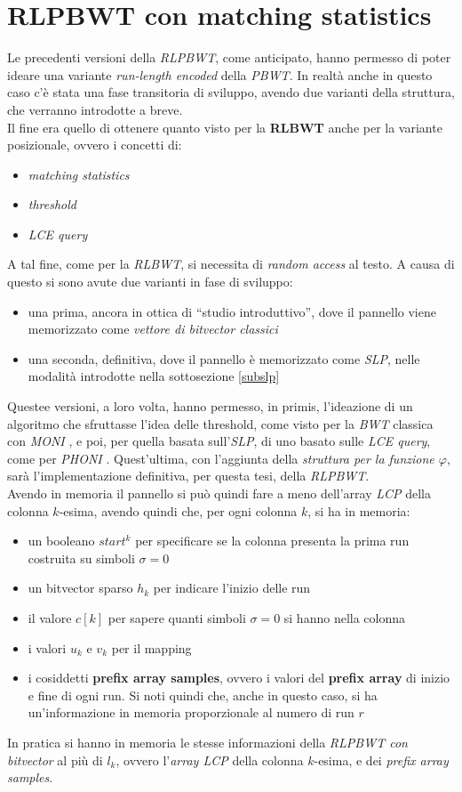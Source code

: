\section{RLPBWT con matching statistics}
Le precedenti versioni della \textit{RLPBWT}, come anticipato, hanno permesso di
poter ideare una variante \textit{run-length encoded} della \textit{PBWT}.
In realtà anche in questo caso c'è stata una fase transitoria di sviluppo,
avendo due varianti della struttura, che verranno introdotte a breve.\\
Il fine era quello di ottenere quanto visto per la \textbf{RLBWT} anche per la
variante posizionale, ovvero i concetti di:
\begin{itemize}
  \item \textit{matching statistics}
  \item \textit{threshold}
  \item \textit{LCE query}
\end{itemize}
A tal fine, come per la \textit{RLBWT}, si necessita di \textit{random access}
al testo. A causa di questo si sono avute due varianti in fase di sviluppo:
\begin{itemize}
  \item una prima, ancora in ottica di ``studio introduttivo'', dove il pannello
  viene memorizzato come \textit{vettore di bitvector classici}
  \item una seconda, definitiva, dove il pannello è memorizzato come
  \textit{SLP}, nelle modalità introdotte nella sottosezione \ref{subslp}
\end{itemize}
Questee versioni, a loro volta, hanno permesso, in primis, l'ideazione di un
algoritmo che sfruttasse l'idea delle threshold, come visto per la \textit{BWT}
classica con \textit{MONI} \cite{moni}, e poi, per quella basata
sull'\textit{SLP}, di uno basato sulle \textit{LCE query}, come per
\textit{PHONI} \cite{phoni}. Quest'ultima, con l'aggiunta della
\textit{struttura per la funzione $\varphi$}, sarà l'implementazione definitiva,
per questa tesi, della \textit{RLPBWT}.\\
Avendo in memoria il pannello si può quindi fare a meno dell'array \textit{LCP}
della colonna $k$-esima, avendo quindi che, per ogni colonna $k$, si ha in
memoria:
\begin{itemize}
  \item un booleano $start^k$ per specificare se la colonna presenta la prima
  run costruita su simboli $\sigma =0$
  \item un bitvector sparso $h_k$ per indicare l'inizio delle run
  \item il valore $c[k]$ per sapere quanti simboli $\sigma=0$ si hanno nella
  colonna 
  \item i valori $u_k$ e $v_k$ per il mapping
  \item i cosiddetti \textbf{prefix array samples}, ovvero i valori del
  \textbf{prefix array} di inizio e fine di ogni run. Si noti quindi che, anche
  in questo caso, si ha un'informazione in memoria proporzionale al numero di
  run $r$ 
\end{itemize}
In pratica si hanno in memoria le stesse informazioni della \textit{RLPBWT con
  bitvector} al più di $l_k$, ovvero l'\textit{array LCP} della colonna
$k$-esima, e dei \textit{prefix array samples}. 
